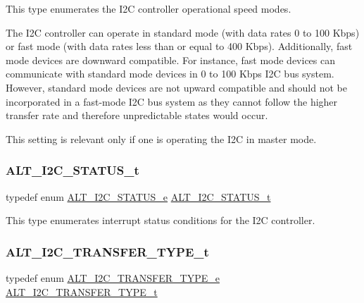 This type enumerates the I2C controller operational speed modes.

The I2C controller can operate in standard mode (with data rates 0 to 100 Kbps) or fast mode (with data rates less than or equal to 400 Kbps). Additionally, fast mode devices are downward compatible. For instance, fast mode devices can communicate with standard mode devices in 0 to 100 Kbps I2C bus system. However, standard mode devices are not upward compatible and should not be incorporated in a fast-\/mode I2C bus system as they cannot follow the higher transfer rate and therefore unpredictable states would occur.

This setting is relevant only if one is operating the I2C in master mode. \mbox{\label{group__ALT__I2C_gaff6fbc8f47536dd27035588f0ea138fe}} 
\subsubsection{\texorpdfstring{ALT\_I2C\_STATUS\_t}{ALT\_I2C\_STATUS\_t}}
{\footnotesize\ttfamily typedef enum \mbox{\hyperlink{group__ALT__I2C_ga229c6d995595615ca923ecc8b6490603}{A\+L\+T\+\_\+\+I2\+C\+\_\+\+S\+T\+A\+T\+U\+S\+\_\+e}}  \mbox{\hyperlink{group__ALT__I2C_gaff6fbc8f47536dd27035588f0ea138fe}{A\+L\+T\+\_\+\+I2\+C\+\_\+\+S\+T\+A\+T\+U\+S\+\_\+t}}}

This type enumerates interrupt status conditions for the I2C controller. \mbox{\label{group__ALT__I2C_gab9525a902b2ee7ce1ffa4b8f99b75f42}} 
\subsubsection{\texorpdfstring{ALT\_I2C\_TRANSFER\_TYPE\_t}{ALT\_I2C\_TRANSFER\_TYPE\_t}}
{\footnotesize\ttfamily typedef enum \mbox{\hyperlink{group__ALT__I2C_gab45046fdc6d7cbe49fc048f26fd88719}{A\+L\+T\+\_\+\+I2\+C\+\_\+\+T\+R\+A\+N\+S\+F\+E\+R\+\_\+\+T\+Y\+P\+E\+\_\+e}}
 \mbox{\hyperlink{group__ALT__I2C_gab9525a902b2ee7ce1ffa4b8f99b75f42}{A\+L\+T\+\_\+\+I2\+C\+\_\+\+T\+R\+A\+N\+S\+F\+E\+R\+\_\+\+T\+Y\+P\+E\+\_\+t}}}

